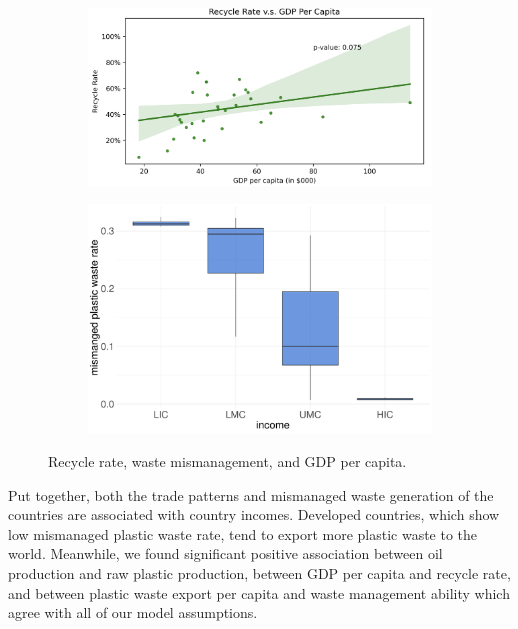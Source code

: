 \documentclass[dvipsnames]{article}
\begin{document}
\begin{figure}[htb!] 
	\centering
			\begin{subfigure}{0.545\textwidth}
		\centering 
		\includegraphics[width=\textwidth]{figures/recycle_rate.png}
	\label{fig:recycle}
	\end{subfigure}
		\begin{subfigure}{0.445\textwidth}
		\centering 
		\includegraphics[width=\textwidth]{figures/boxplot_mis_income.pdf}
		\label{subfig:scatter_mis}
	\end{subfigure}
		\caption{\small Recycle rate, waste mismanagement, and GDP per capita.}
	\label{fig:income_rec_mis}
\end{figure}

Put together, both the trade patterns and mismanaged waste generation of the countries are associated with country incomes. Developed countries, which show low mismanaged plastic waste rate, tend to export more plastic waste to the world. Meanwhile, we found significant positive association between oil production and raw plastic production, between GDP per capita and recycle rate, and between plastic waste export per capita and waste management ability which agree with all of our model assumptions.
\end{document}
